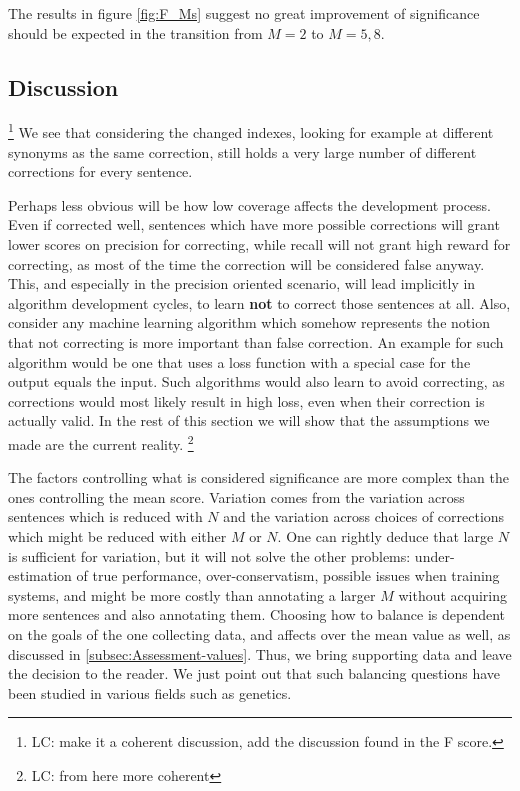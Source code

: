 \documentclass[letter,11pt]{article}
\newcommand{\lc}[1]{\footnote{\color{green}LC: #1}}
\begin{document}
		The results in figure \ref{fig:F_Ms} suggest no great improvement of significance should be expected in the transition from $M=2$ to $M=5,8$.
		
		\subsection{Discussion}
		\lc{make it a coherent discussion, add the discussion found in the F score.}
		We see that considering the changed indexes, looking for example at different synonyms as the same correction, still holds a very large number of different corrections for every sentence.
		
		Perhaps less obvious will be how low coverage affects the development
		process. Even if corrected well, sentences which have more possible
		corrections will grant lower scores on precision for correcting, while recall will not grant high reward for correcting, as most of the time the correction will be considered false anyway. This, and especially in the precision oriented scenario, will lead implicitly in algorithm development cycles, to learn \textbf{not} to correct those sentences at all. Also, consider any machine learning algorithm which somehow represents the notion that not correcting is more important than false correction. An example for such algorithm would be one that uses a loss function with a special case for the output equals the input. Such algorithms would also learn to avoid correcting, as corrections would most likely result in high loss, even when their correction is actually valid.
		In the rest of this section we will show that the assumptions we made are the current reality. 
		\lc{from here more coherent}
		
		The factors controlling what is considered significance are more complex than the ones controlling the mean score. Variation comes from the variation across sentences which is reduced with $N$ and the variation across choices of corrections which might be reduced with either $M$ or $N$. One can rightly deduce that large $N$ is sufficient for variation, but it will not solve the other problems: under-estimation of true performance,
		over-conservatism, possible issues when training systems, and might be more costly than annotating a larger $M$ without acquiring more sentences and also annotating them.
		Choosing how to balance is dependent on the goals of the one collecting data, and affects over the mean value as well, as discussed in \ref{subsec:Assessment-values}. Thus, we bring supporting data and leave the decision to the reader. We just point out that such balancing questions have been studied in various fields such as genetics\cite{ionita2010optimal}.
		
\end{document}
